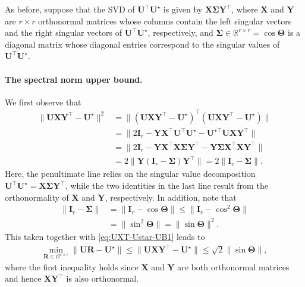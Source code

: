 As before, suppose that the SVD of $\bm{U}^{\top}\bm{U}^{\star}$
is given by $\bm{X}\bm{\Sigma}\bm{Y}^{\top}$, where $\bm{X}$ and $\bm{Y}$
are $r\times r$ orthonormal matrices whose columns contain the left singular vectors and the right singular vectors of $\bm{U}^{\top}\bm{U}^{\star}$, respectively, and $\bm{\Sigma}\in \mathbb{R}^{r\times r}= \cos\bm{\Theta}$ is a diagonal matrix whose diagonal entries correspond to the singular values of $\bm{U}^{\top}\bm{U}^{\star}$.





\paragraph{The spectral norm upper bound.}
We first observe that
%
\begin{align}
\|\bm{U}\bm{X}\bm{Y}^{\top}-\bm{U}^{\star}\|^{2} & =\|(\bm{U}\bm{X}\bm{Y}^{\top}-\bm{U}^{\star})^{\top}(\bm{U}\bm{X}\bm{Y}^{\top}-\bm{U}^{\star})\|\nonumber\\
 & =\|2\bm{I}_{r}-\bm{Y}\bm{X}^{\top}\bm{U}^{\top}\bm{U}^{\star}-\bm{U}^{\star\top}\bm{U}\bm{X}\bm{Y}^{\top}\| \nonumber\\
	& =\|2\bm{I}_{r}-\bm{Y}\bm{X}^{\top}\bm{X}\bm{\Sigma}\bm{Y}^{\top}-\bm{Y}\bm{\Sigma}\bm{X}^{\top}\bm{X}\bm{Y}^{\top}\| \nonumber\\
 & =2\|\bm{Y}(\bm{I}_{r}-\bm{\Sigma})\bm{Y}^{\top}\|=2\|\bm{I}_{r}-\bm{\Sigma}\|.
	\label{eq:UXT-Ustar-UB1}
\end{align}
%
Here, the penultimate line relies on the singular value decomposition $\bm{U}^{\top}\bm{U}^{\star}=\bm{X}\bm{\Sigma}\bm{Y}^{\top}$,
while the two identities in the last line result from  the orthonormality of $\bm{X}$ and $\bm{Y}$, respectively. In addition, note that
%
\begin{align*}
	\|\bm{I}_{r}-\bm{\Sigma}\| &= \|\bm{I}_{r}-\cos\bm{\Theta}\|\leq\|\bm{I}_{r}-\cos^{2}\bm{\Theta}\| \\
	& =\|\sin^{2}\bm{\Theta}\|=\|\sin\bm{\Theta}\|^2.
\end{align*}
%
This taken together with \eqref{eq:UXT-Ustar-UB1} leads to
%
\begin{align*}
	\min_{\bm{R}\in \mathcal{O}^{r\times r}}\big\|\bm{U}\bm{R}-\bm{U}^{\star}\big\|
	\leq \big\|\bm{U}\bm{X}\bm{Y}^{\top}-\bm{U}^{\star}\big\| \leq \sqrt{2} \|\sin \bm{\Theta} \| ,
\end{align*}
%
where the first inequality holds since $\bm{X}$ and $\bm{Y}$ are both orthonormal matrices and hence $\bm{X}\bm{Y}^{\top}$ is also orthonormal.



